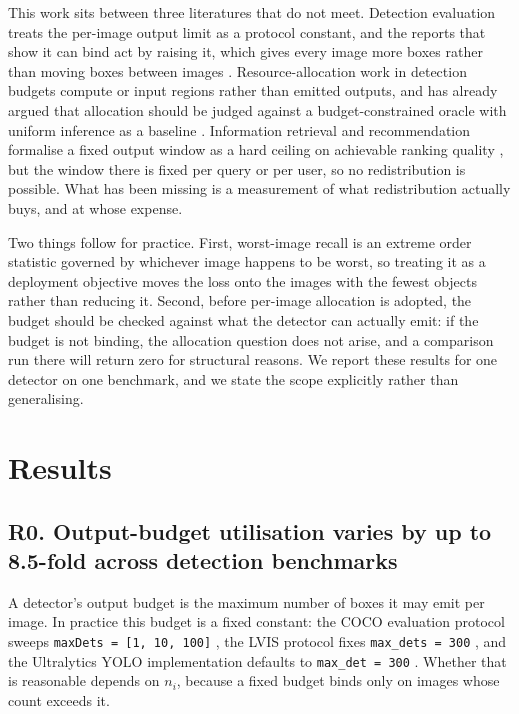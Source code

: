 \documentclass[sn-mathphys,Numbered]{sn-jnl}
\begin{document}
This work sits between three literatures that do not meet. Detection evaluation treats the per-image output limit as a protocol constant, and the reports that show it can bind act by raising it, which gives every image more boxes rather than moving boxes between images \cite{dave2021devil,fu2021lvis,oksuz2022lrp}. Resource-allocation work in detection budgets compute or input regions rather than emitted outputs, and has already argued that allocation should be judged against a budget-constrained oracle with uniform inference as a baseline \cite{densescout2026,decisionvalue2026}. Information retrieval and recommendation formalise a fixed output window as a hard ceiling on achievable ranking quality \cite{wang2026recceiling,buckley2004reliability}, but the window there is fixed per query or per user, so no redistribution is possible. What has been missing is a measurement of what redistribution actually buys, and at whose expense.

Two things follow for practice. First, worst-image recall is an extreme order statistic governed by whichever image happens to be worst, so treating it as a deployment objective moves the loss onto the images with the fewest objects rather than reducing it. Second, before per-image allocation is adopted, the budget should be checked against what the detector can actually emit: if the budget is not binding, the allocation question does not arise, and a comparison run there will return zero for structural reasons. We report these results for one detector on one benchmark, and we state the scope explicitly rather than generalising.

\section{Results}
\subsection{R0. Output-budget utilisation varies by up to 8.5-fold across detection benchmarks}

A detector's output budget is the maximum number of boxes it may emit per image. In practice this budget is a fixed constant: the COCO evaluation protocol sweeps \texttt{maxDets = [1, 10, 100]} \cite{lin2014coco}, the LVIS protocol fixes \texttt{max\_dets = 300} \cite{gupta2019lvis}, and the Ultralytics YOLO implementation defaults to \texttt{max\_det = 300} \cite{jocher2026yolo26}.  Whether that is reasonable depends on $n_i$, because a fixed budget binds only on images whose count exceeds it.
\end{document}
